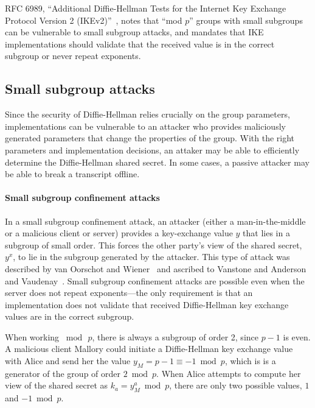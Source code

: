 RFC 6989, ``Additional Diffie-Hellman Tests for the Internet Key Exchange
Protocol Version 2 (IKEv2)''~\cite{rfc6989}, notes that ``mod $p$'' groups with
small subgroups can be vulnerable to small subgroup attacks, and mandates that
IKE implementations should validate that the received value is in the correct
subgroup or never repeat exponents.

\subsection{Small subgroup attacks}
\label{subsec:small-subgroup-attack}

Since the security of Diffie-Hellman relies crucially on the group parameters,
implementations can be vulnerable to an attacker who provides maliciously
generated parameters that change the properties of the group. 
With the right parameters and implementation decisions, an attaker may be able
to efficiently determine the Diffie-Hellman shared secret. In some cases, a
passive attacker may be able to break a transcript offline.

\paragraph{Small subgroup confinement attacks}
In a small subgroup confinement attack, an attacker (either a man-in-the-middle
or a malicious client or server) provides a key-exchange value $y$ that lies in a
subgroup of small order.  This forces the other party's view of the shared
secret, $y^x$, to lie in the subgroup generated by the attacker.  This
type of attack was described by van Oorschot and Wiener~\cite{van1996diffie}
and ascribed to Vanstone and Anderson and Vaudenay~\cite{Anderson1996}.  Small
subgroup confinement attacks are possible even when the server does not repeat
exponents---the only requirement is that an implementation does not validate
that received Diffie-Hellman key exchange values are in the correct subgroup.


When working $\bmod\,p$, there is always a subgroup of order 2, since $p-1$ is
even. A malicious client Mallory could initiate a Diffie-Hellman key exchange
value with Alice and send her the value $y_M = p-1 \equiv -1 \bmod p$, which is
is a generator of the group of order $2 \bmod p$.  When Alice attempts to
compute her view of the shared secret as $k_a = y_M^a \bmod p$, there are only
two possible values, $1$ and $-1 \bmod p$.

